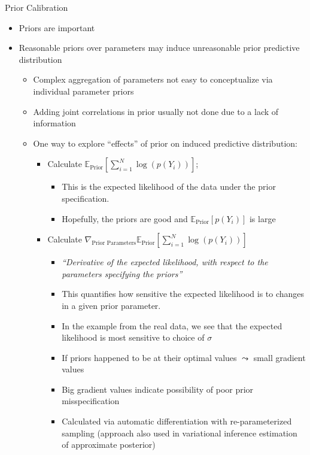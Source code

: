\documentclass[11pt,letterpaper]{article}
\theoremstyle{plain}
\newcommand{\E}{\mathbb{E}}
\begin{document}
{\sc Prior Calibration}
\begin{itemize}
\item Priors are important 
\item Reasonable priors over parameters may induce unreasonable prior predictive distribution 
\begin{itemize}
\item Complex aggregation of parameters not easy to conceptualize via individual parameter priors 
\item Adding joint correlations in prior usually not done due to a lack of information
\item One way to explore ``effects'' of prior on induced predictive distribution: 
\begin{itemize}
\item Calculate $\E_{\textrm{Prior}}\left[ \sum_{i=1}^N \log(p(Y_i))\right]$;
\begin{itemize}
\item This is the expected likelihood of the data under the prior specification. 
\item Hopefully, the priors are good and $\E_{\textrm{Prior}}[ p(Y_i)]$ is large 
\end{itemize}
\item Calculate $\nabla_{\textrm{Prior Parameters}} \E_{\textrm{Prior}}\left[ \sum_{i=1}^N \log(p(Y_i))\right]$
\begin{itemize}
\item {\it ``Derivative of the expected likelihood, with respect to the parameters specifying the priors'' }
\item This quantifies how sensitive the expected likelihood is to changes in a given prior parameter. 
\item In the example from the real data, we see that the expected likelihood is most sensitive to choice of $\sigma$ 
\item If priors happened to be at their optimal values $\leadsto$ small gradient values 
\item Big gradient values indicate possibility of poor prior misspecification 
\item Calculated via automatic differentiation with re-parameterized sampling (approach also used in variational inference estimation of approximate posterior)
\end{itemize}
\end{itemize}
\end{itemize}
\end{itemize}
\end{document}
